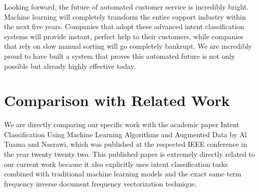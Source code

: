 \documentclass[12pt]{article}
\begin{document}
Looking forward, the future of automated customer service is incredibly bright. Machine learning will completely transform the entire support industry within the next five years. Companies that adopt these advanced intent classification systems will provide instant, perfect help to their customers, while companies that rely on slow manual sorting will go completely bankrupt. We are incredibly proud to have built a system that proves this automated future is not only possible but already highly effective today.

\section{Comparison with Related Work}
We are directly comparing our specific work with the academic paper Intent Classification Using Machine Learning Algorithms and Augmented Data by Al Tuama and Nasrawi, which was published at the respected IEEE conference in the year twenty twenty two. This published paper is extremely directly related to our current work because it also explicitly uses intent classification tasks combined with traditional machine learning models and the exact same term frequency inverse document frequency vectorization technique.
\end{document}
